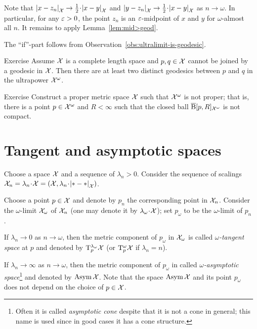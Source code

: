 Note that 
$\dist{x}{z_n}{\spc{X}}\to \tfrac12\cdot \dist{x}{y}{\spc{X}}$
and 
$\dist{y}{z_n}{\spc{X}}\to \tfrac12\cdot \dist{x}{y}{\spc{X}}$
as 
$n\to\omega$.
In particular, for any $\varepsilon>0$, the point $z_n$ is an $\varepsilon$-midpoint of $x$ and $y$ for $\omega$-almost all $n$.
It remains to apply Lemma~\ref{lem:mid>geod}.

The ``if''-part follows from Observation~\ref{obs:ultralimit-is-geodesic}.
\qeds

\begin{thm}{Exercise}\label{ex:two-geodesics-in-ultrapower}
Assume $\mathcal{X}$ is a complete length space 
and $p,q\in\mathcal{X}$ cannot be joined by a geodesic in $\mathcal{X}$.  
Then there are at least two distinct geodesics between $p$ and $q$ 
in the ultrapower $\mathcal{X}^\omega$.
\end{thm}

\begin{thm}{Exercise}
 Construct a proper metric space $\mathcal{X}$ such that $\mathcal{X}^\omega$ is not proper; that is, there is a point $p\in \mathcal{X}^\omega$ and $R<\infty$ such that the closed ball $\overline{\mathrm{B}}{}[p,R]_{\mathcal{X}^\omega}$ is not compact.
\end{thm}

\section{Tangent and asymptotic spaces}

Choose a space $\mathcal{X}$ and a sequence of $\lambda_n>0$.
Consider the sequence of scalings $\spc{X}_n=\lambda_n\cdot\spc{X}=(\spc{X},\lambda_n\cdot\dist{*}{*}{\spc{X}})$.

Choose a point $p\in \mathcal{X}$ and denote by $p_n$ the corresponding point in $\mathcal{X}_n$.
Consider the $\omega$-limit $\mathcal{X}_\omega$ of $\mathcal{X}_n$ (one may denote it by $\lambda_\omega\cdot \spc{X}$);
set $p_\omega$ to be the $\omega$-limit of $p_n$.

If $\lambda_n\to 0$ as $n\to\omega$, then the metric component of $p_\omega$ in $\mathcal{X}_\omega$ is called \emph{$\omega$-tangent space} at $p$ and denoted by $\mathrm{T}_p^{\lambda_\omega}\mathcal{X}$ (or $\mathrm{T}_p^{\omega}\mathcal{X}$ if $\lambda_n=n$).\label{page:ultratangent space}

If $\lambda_n\to \infty$ as $n\to\omega$, then the metric component of $p_\omega$ in called \emph{$\omega$-asymptotic space}\footnote{Often it is called \emph{asymptotic cone} despite that it is not a cone in general; this name is used since in good cases it has a cone structure.}  and denoted by $\mathop{\rm Asym}\nolimits\mathcal{X}$.
Note that the space $\mathop{\rm Asym}\nolimits\mathcal{X}$ and its point $p_\omega$ does not depend on the choice of $p\in \mathcal{X}$.

